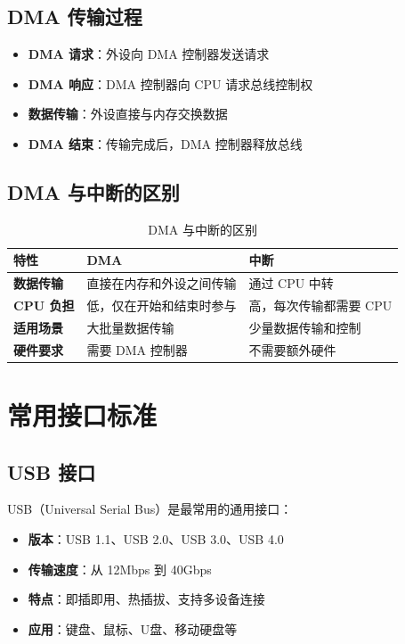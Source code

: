 \documentclass[12pt,UTF8]{ctexbook}
\begin{document}
\section{DMA 传输过程}

\begin{itemize}[leftmargin=2cm]
    \item \textbf{DMA 请求}：外设向 DMA 控制器发送请求
    \item \textbf{DMA 响应}：DMA 控制器向 CPU 请求总线控制权
    \item \textbf{数据传输}：外设直接与内存交换数据
    \item \textbf{DMA 结束}：传输完成后，DMA 控制器释放总线
\end{itemize}

\section{DMA 与中断的区别}

\begin{table}[htbp]
    \centering
    \caption{DMA 与中断的区别}
    \begin{tabular}{|p{3cm}|p{3.5cm}|p{3.5cm}|}
        \hline
        \textbf{特性} & \textbf{DMA} & \textbf{中断} \\
        \hline
        \textbf{数据传输} & 直接在内存和外设之间传输 & 通过 CPU 中转 \\
        \hline
        \textbf{CPU 负担} & 低，仅在开始和结束时参与 & 高，每次传输都需要 CPU \\
        \hline
        \textbf{适用场景} & 大批量数据传输 & 少量数据传输和控制 \\
        \hline
        \textbf{硬件要求} & 需要 DMA 控制器 & 不需要额外硬件 \\
        \hline
    \end{tabular}
\end{table}

\chapter{常用接口标准}
\label{chap:interface_standards}

\section{USB 接口}

USB（Universal Serial Bus）是最常用的通用接口：

\begin{itemize}[leftmargin=2cm]
    \item \textbf{版本}：USB 1.1、USB 2.0、USB 3.0、USB 4.0
    \item \textbf{传输速度}：从 12Mbps 到 40Gbps
    \item \textbf{特点}：即插即用、热插拔、支持多设备连接
    \item \textbf{应用}：键盘、鼠标、U盘、移动硬盘等
\end{itemize}
\end{document}
